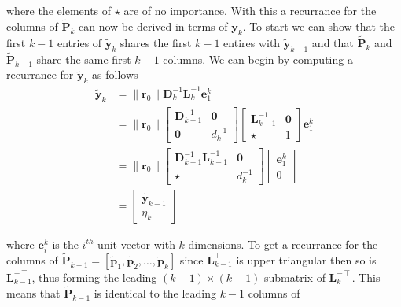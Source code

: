 where the elements of $\star$ are of no importance. With this a recurrance for the columns of $\tilde{\bm{P}}_k$ can now be derived in terms of $\bm{y}_k$. To start we can show that the first $k-1$ entries of $\tilde{\bm{y}}_{k}$ shares the first $k-1$ entires with $\tilde{\bm{y}}_{k-1}$ and that $\tilde{\bm{P}}_k$ and $\tilde{\bm{P}}_{k-1}$ share the same first $k-1$ columns. We can begin by computing a recurrance for $\tilde{\bm{y}}_{k}$ as follows
\begin{align*}
    \tilde{\bm{y}}_{k} & = \| \bm{r}_0 \| \bm{D}_k^{-1} \bm{L}_k^{-1} \bm{e}_1^k \\
                       & = \| \bm{r}_0 \|
    \begin{bmatrix}
        \bm{D}_{k-1}^{-1} & \bm{0}   \\
        \bm{0}            & d_k^{-1}
    \end{bmatrix}
    \begin{bmatrix}
        \bm{L}_{k-1}^{-1} & \bm{0} \\
        \star             & 1
    \end{bmatrix}
    \bm{e}_1^k                                                                   \\
                       & = \| \bm{r}_0 \|
    \begin{bmatrix}
        \bm{D}_{k-1}^{-1} \bm{L}_{k-1}^{-1} & \bm{0}   \\
        \star                               & d_k^{-1}
    \end{bmatrix}
    \begin{bmatrix}
        \bm{e}_1^k \\
        0
    \end{bmatrix}                                                   \\
                       & =
    \begin{bmatrix}
        \tilde{\bm{y}}_{k-1} \\
        \eta_k
    \end{bmatrix}
\end{align*}

where $\bm{e}_i^k$ is the $i^{th}$ unit vector with $k$ dimensions. To get a recurrance for the columns of $\tilde{\bm{P}}_{k-1} = \left[ \tilde{\bm{p}}_1 , \tilde{\bm{p}}_2 , \ldots , \tilde{\bm{p}}_k \right]$ since $\bm{L}_{k-1}^{\intercal}$ is upper triangular then so is $\bm{L}_{k-1}^{-\intercal}$, thus forming the leading $(k-1) \times (k-1)$ submatrix of $\bm{L}_{k}^{-\intercal}$. This means that $\tilde{\bm{P}}_{k-1}$ is identical to the leading $k-1$ columns of

